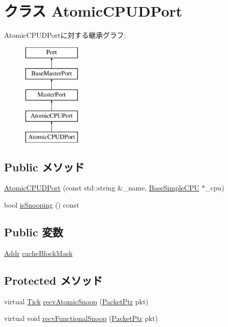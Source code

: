 \hypertarget{classAtomicSimpleCPU_1_1AtomicCPUDPort}{
\section{クラス AtomicCPUDPort}
\label{classAtomicSimpleCPU_1_1AtomicCPUDPort}
}
AtomicCPUDPortに対する継承グラフ:\begin{figure}[H]
\begin{center}
\leavevmode
\includegraphics[height=5cm]{classAtomicSimpleCPU_1_1AtomicCPUDPort}
\end{center}
\end{figure}
\subsection*{Public メソッド}
\begin{DoxyCompactItemize}
\item 
\hyperlink{classAtomicSimpleCPU_1_1AtomicCPUDPort_a92cd757612aceef75cb77f72bed7ec83}{AtomicCPUDPort} (const std::string \&\_\-name, \hyperlink{classBaseSimpleCPU_1_1BaseSimpleCPU}{BaseSimpleCPU} $\ast$\_\-cpu)
\item 
bool \hyperlink{classAtomicSimpleCPU_1_1AtomicCPUDPort_a5ce11b7a254d3cb756d94568f7cbc25d}{isSnooping} () const 
\end{DoxyCompactItemize}
\subsection*{Public 変数}
\begin{DoxyCompactItemize}
\item 
\hyperlink{base_2types_8hh_af1bb03d6a4ee096394a6749f0a169232}{Addr} \hyperlink{classAtomicSimpleCPU_1_1AtomicCPUDPort_af4264b12b32db39099b579e1ed670312}{cacheBlockMask}
\end{DoxyCompactItemize}
\subsection*{Protected メソッド}
\begin{DoxyCompactItemize}
\item 
virtual \hyperlink{base_2types_8hh_a5c8ed81b7d238c9083e1037ba6d61643}{Tick} \hyperlink{classAtomicSimpleCPU_1_1AtomicCPUDPort_a886d584c81ee4e398ff8069907f6e1a5}{recvAtomicSnoop} (\hyperlink{classPacket}{PacketPtr} pkt)
\item 
virtual void \hyperlink{classAtomicSimpleCPU_1_1AtomicCPUDPort_a284dfb90c168233c9d416bc07de8fefe}{recvFunctionalSnoop} (\hyperlink{classPacket}{PacketPtr} pkt)
\end{DoxyCompactItemize}
